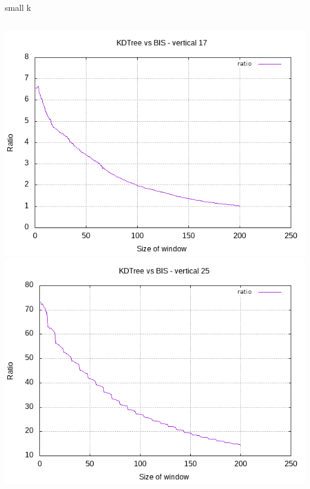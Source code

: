 \documentclass[pdf]{beamer}
\begin{document}
\begin{frame}{small k}
  \begin{columns}
    \includegraphics[scale=0.35]{pictures/analysis/smalls/vert_fac_17.png}
    \includegraphics[scale=0.35]{pictures/analysis/smalls/vert_fac_25.png}
  \end{columns}
\end{frame}
\end{document}
